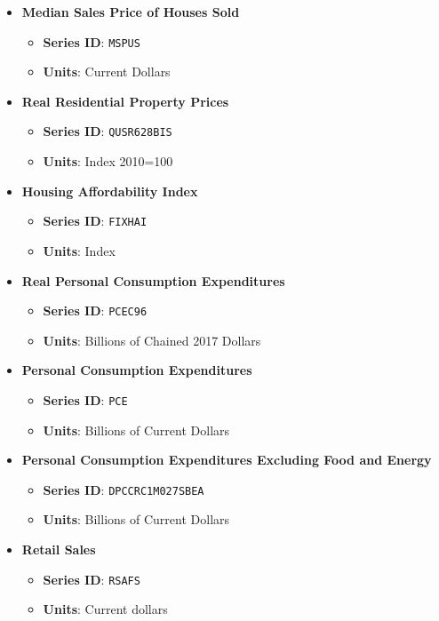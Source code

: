 \documentclass{article}
\begin{document}
  \begin{itemize} 
    \item \textbf{Median Sales Price of Houses Sold}
    \begin{itemize}
        \item \textbf{Series ID}: \texttt{MSPUS}
        \item \textbf{Units}: Current Dollars
    \end{itemize}

    \item \textbf{Real Residential Property Prices}
    \begin{itemize}
        \item \textbf{Series ID}: \texttt{QUSR628BIS}
        \item \textbf{Units}: Index 2010=100
    \end{itemize}
    
    \item \textbf{Housing Affordability Index}
    \begin{itemize}
        \item \textbf{Series ID}: \texttt{FIXHAI}
        \item \textbf{Units}: Index
    \end{itemize}
    
    \item \textbf{Real Personal Consumption Expenditures}
    \begin{itemize}
        \item \textbf{Series ID}: \texttt{PCEC96}
        \item \textbf{Units}: Billions of Chained 2017 Dollars
    \end{itemize}

    \item \textbf{Personal Consumption Expenditures}
    \begin{itemize}
        \item \textbf{Series ID}: \texttt{PCE}
        \item \textbf{Units}: Billions of Current Dollars
    \end{itemize}

    \item \textbf{Personal Consumption Expenditures Excluding Food and Energy}
    \begin{itemize}
        \item \textbf{Series ID}: \texttt{DPCCRC1M027SBEA}
        \item \textbf{Units}: Billions of Current Dollars
    \end{itemize}
    
    \item \textbf{Retail Sales}
    \begin{itemize}
        \item \textbf{Series ID}: \texttt{RSAFS}
        \item \textbf{Units}: Current dollars
    \end{itemize}

\end{itemize}    
\end{document}
